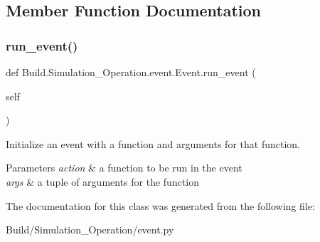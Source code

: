 \subsection{Member Function Documentation}
\mbox{\label{class_build_1_1_simulation___operation_1_1event_1_1_event_a0714e3275d4c67cd5e1757e846fc3dbf}} 
\subsubsection{\texorpdfstring{run\+\_\+event()}{run\_event()}}
{\footnotesize\ttfamily def Build.\+Simulation\+\_\+\+Operation.\+event.\+Event.\+run\+\_\+event (\begin{DoxyParamCaption}\item[{}]{self }\end{DoxyParamCaption})}



Initialize an event with a function and arguments for that function. 


\begin{DoxyParams}{Parameters}
{\em action} & a function to be run in the event \\
\hline
{\em args} & a tuple of arguments for the function \\
\hline
\end{DoxyParams}


The documentation for this class was generated from the following file\+:\begin{DoxyCompactItemize}
\item 
Build/\+Simulation\+\_\+\+Operation/event.\+py\end{DoxyCompactItemize}
